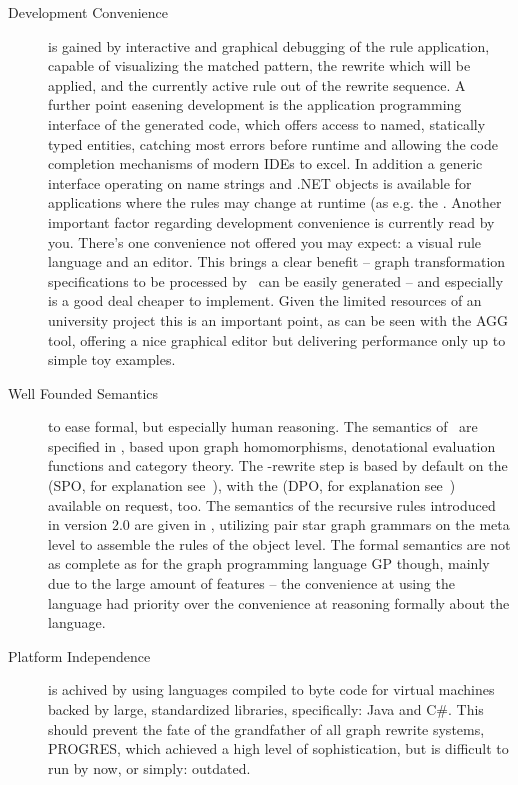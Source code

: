\begin{description}
\item[Development Convenience]
is gained by interactive and graphical debugging of the rule application, capable of visualizing the matched pattern, the rewrite which will be applied, and the currently active rule out of the rewrite sequence.
A further point easening development is the application programming interface of the generated code,
which offers access to named, statically typed entities, catching most errors before runtime and allowing the code completion mechanisms of modern IDEs to excel.
In addition a generic interface operating on name strings and .NET objects is available for applications where the rules may change at runtime (as e.g. the \GrShell\).
Another important factor regarding development convenience is currently read by you.
There's one convenience not offered you may expect: a visual rule language and an editor.
This brings a clear benefit -- graph transformation specifications to be processed by \GrG\ can be easily generated --
and especially is a good deal cheaper to implement. Given the limited resources of an university project this is an important point,
as can be seen with the AGG\cite{agg} tool, offering a nice graphical editor but delivering performance only up to simple toy examples.

\item[Well Founded Semantics]
to ease formal, but especially human reasoning.
The semantics of \GrG\ are specified in \cite{DissRuby}, based upon graph homomorphisms, denotational evaluation functions and category theory.
The \GrG-rewrite step is based by default on the  (SPO, for explanation see~\cite{spoapproach}),
with the  (DPO, for explanation see~\cite{dpoapproach}) available on request, too.
The semantics of the recursive rules introduced in version 2.0 are given in \cite{Jak:08},
utilizing pair star graph grammars on the meta level to assemble the rules of the object level.
The formal semantics are not as complete as for the graph programming language GP\cite{gp} though, mainly due to the large amount of features 
-- the convenience at using the language had priority over the convenience at reasoning formally about the language.

\item[Platform Independence]
is achived by using languages compiled to byte code for virtual machines backed by large, standardized libraries, specifically: Java and C\#.
This should prevent the fate of the grandfather of all graph rewrite systems, PROGRES\cite{schuerr99progres},
which achieved a high level of sophistication, but is difficult to run by now, or simply: outdated.


\end{description}
